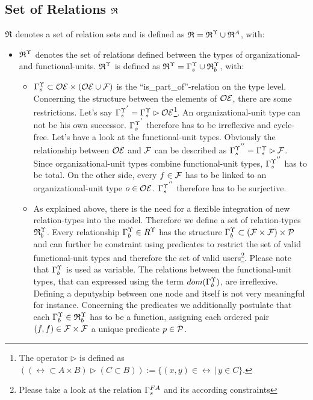 \subsection{Set of Relations $\mathfrak{R}$}
	$\mathfrak{R}$ denotes a set of relation sets and is defined as 
	$\mathfrak{R} = {\mathfrak{R}}^{\Upsilon} \cup {\mathfrak{R}}^{A}$, with: 

	\begin{itemize}

	\item ${\mathfrak{R}}^{\Upsilon}$ denotes the set of relations defined between the types of organizational- and functional-units. 
	${\mathfrak{R}}^{\Upsilon}$ is defined as ${\mathfrak{R}}^{\Upsilon} = {\Gamma}^{\Upsilon}_{s} \cup {\mathfrak{R}}^{\Upsilon}_{b}$, with: 
	\begin{itemize}

		\item ${\Gamma}^{\Upsilon}_{s} \subset \mathcal{OE} \times (\mathcal{OE} \cup \mathcal{F})$ is the ``is\_part\_of''-relation on the type level. Concerning the structure between the elements of $\mathcal{OE}$, there are some restrictions. Let's say ${{\Gamma}^{\Upsilon}_{s}}^{'} = {\Gamma}^{\Upsilon}_{s} \rhd \mathcal{OE}$\footnote{The operator $\rhd$ is defined as $((\rel \subset A \times B) \rhd (C \subset B)) := \{(x,y) \in \rel \, \vert \, y \in C \}$.}.
		An organizational-unit type can not be his own successor. ${{\Gamma}^{\Upsilon}_{s}}^{'}$ therefore has to be irreflexive and cycle-free. 
		Let's have a look at the functional-unit types. Obviously the relationship between $\mathcal{OE}$ and $\mathcal{F}$ can be described as ${{\Gamma}^{\Upsilon}_{s}}^{''} = {\Gamma}^{\Upsilon}_{s} \rhd \mathcal{F}$. Since organizational-unit types combine functional-unit types, ${{\Gamma}^{\Upsilon}_{s}}^{''}$ has to be total. On the other side, every $f \in \mathcal{F}$ has to be linked to an organizational-unit type $o \in \mathcal{OE}$. ${{\Gamma}^{\Upsilon}_{s}}^{''}$ therefore has to be surjective.

		\item As explained above, there is the need for a flexible integration of new relation-types into the model. Therefore we define a set of relation-types ${\mathfrak{R}}^{\Upsilon}_{b}$. Every relationship ${\Gamma}^{\Upsilon}_{b} \in R^{\Upsilon}$ has the structure ${\Gamma}^{\Upsilon}_{b} \subset (\mathcal{F} \times \mathcal{F}) \times \mathcal{P}$ and can further be constraint using predicates to restrict the set of valid functional-unit types and therefore the set of valid users\footnote{Please take a look at the relation ${\Gamma}^{FA}_{s}$ and its according constraints}. Please note that ${\Gamma}^{\Upsilon}_{b}$ is used as variable. The relations between the functional-unit types, that can expressed using the term $dom({\Gamma}^{\Upsilon}_{b})$, are irreflexive. Defining a deputyship between one node and itself is not very meaningful for instance. Concerning the predicates we additionally postulate that each ${\Gamma}^{\Upsilon}_{b} \in {\mathfrak{R}}^{\Upsilon}_{b}$ has to be a function, assigning each ordered pair $(f,f) \in \mathcal{F} \times \mathcal{F}$ a unique predicate $p \in \mathcal{P}$.
 

\end{itemize}
\end{itemize}
